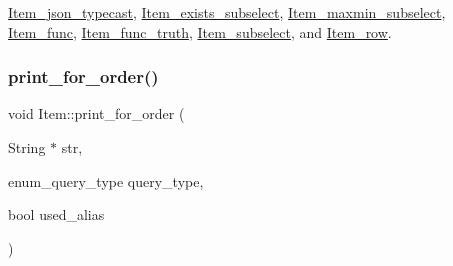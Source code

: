 \mbox{\hyperlink{classItem__json__typecast_a94def4699135226915f3350f5cb6dde7}{Item\+\_\+json\+\_\+typecast}}, \mbox{\hyperlink{classItem__exists__subselect_a795c650acea24859e6ff1d6f82d5a2ec}{Item\+\_\+exists\+\_\+subselect}}, \mbox{\hyperlink{classItem__maxmin__subselect_ad03a1c165ac9ec019b5c7e80f108cddd}{Item\+\_\+maxmin\+\_\+subselect}}, \mbox{\hyperlink{classItem__func_afb302ee25d4721ace27d3f5053d4ee41}{Item\+\_\+func}}, \mbox{\hyperlink{classItem__func__truth_aa17f138c8366c33e377d3e64384415c1}{Item\+\_\+func\+\_\+truth}}, \mbox{\hyperlink{classItem__subselect_a61f70e7dc36e3aad77919971995cccb9}{Item\+\_\+subselect}}, and \mbox{\hyperlink{classItem__row_a9392533818e1f941a356ba46ba5c001c}{Item\+\_\+row}}.

\mbox{\label{classItem_a57c4fb57ce8c51fcd6b33675930e90ca}} 
\subsubsection{\texorpdfstring{print\+\_\+for\+\_\+order()}{print\_for\_order()}}
{\footnotesize\ttfamily void Item\+::print\+\_\+for\+\_\+order (\begin{DoxyParamCaption}\item[{String $\ast$}]{str,  }\item[{enum\+\_\+query\+\_\+type}]{query\+\_\+type,  }\item[{bool}]{used\+\_\+alias }\end{DoxyParamCaption})}

